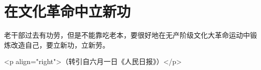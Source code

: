 \section[在文化革命中立新功（一九六七年六月）]{在文化革命中立新功}


老干部过去有功劳，但是不能靠吃老本，要很好地在无产阶级文化大革命运动中锻炼改造自己，要立新功，立新劳。

<p align="right">（转引自六月一日《人民日报》）</p>


